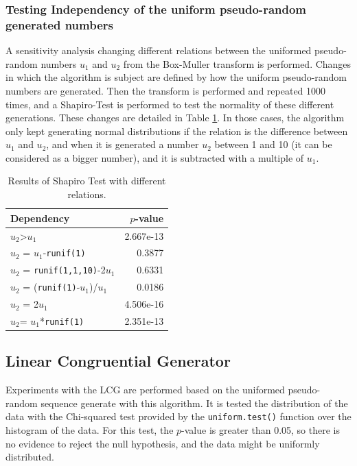 \documentclass[10pt,leter,openany]{article}
\begin{document}
		

	\subsubsection{Testing Independency of the uniform pseudo-random generated numbers}

		A sensitivity analysis changing different relations between the uniformed pseudo-random numbers $ u_{1} $ and $ u_{2} $ from the Box-Muller transform is performed. Changes in which the algorithm is subject are defined by how the uniform pseudo-random numbers are generated. Then the transform is performed and repeated 1000 times, and a Shapiro-Test is performed to test the normality of these different generations. These changes are detailed in Table \ref{tab:dep}. In those cases, the algorithm only kept generating normal distributions if the relation is the difference between $ u_{1}$ and $ u_{2} $, and when it is generated a number $ u_{2} $ between 1 and 10 (it can be considered as a bigger number), and it is subtracted with a multiple of $u_{1}$.


		\begin{table}[]
			\centering
			\caption{Results of Shapiro Test with different relations.}
			\label{tab:dep}
			\begin{tabular}{@{}lr@{}}
				\toprule
				Dependency                     & $ p $-value   \\ \midrule
				$ u_{2} $\textgreater{}$u_{1}$             & 2.667e-13 \\
				$ u_{2} $ = $u_{1}$-\texttt{runif(1)}               & 0.3877    \\
				$ u_{2} $ = \texttt{runif(1,1,10)}-2$u_{1}$ & 0.6331    \\
				$ u_{2} $ = (\texttt{runif(1)}-$u_{1}$)/$u_{1}$          & 0.0186    \\
				$ u_{2} $ = 2$u_{1}$                     & 4.506e-16 \\
				$ u_{2} $= $u_{1}$*\texttt{runif(1)}               & 2.351e-13 \\ \bottomrule
			\end{tabular}
		\end{table}

	\subsection{Linear Congruential Generator}

		Experiments with the LCG are performed based on the uniformed pseudo-random sequence generate with this algorithm. It is tested the distribution of the data with the Chi-squared test provided by the \texttt{uniform.test()} function over the histogram of the data. For this test, the $p$-value is greater than 0.05, so there is no evidence to reject the null hypothesis, and the data might be uniformly distributed.
\end{document}
